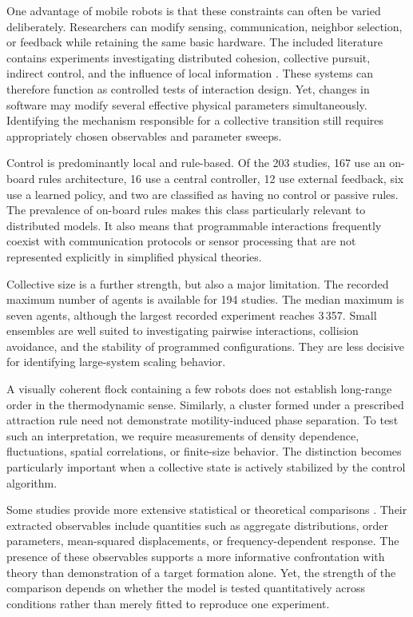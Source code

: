 One advantage of mobile robots is that these
constraints can often be varied deliberately.
Researchers can modify sensing, communication,
neighbor selection, or feedback while retaining
the same basic hardware. The included literature
contains experiments investigating distributed
cohesion, collective pursuit, indirect control,
and the influence of local information
\cite{Lee2022distributedcohesive,Tran2022frontierledswarmin,Yang2023collectivechaseem,Vega2023indirectswarmcontr,Vega2023simulatelessexpec,Vega2024agentbasedemulatio,Gao2023robustdistributedc,Baumann2024hybridflockforma,Zhou2024anticipationpromote,CetinaDenis2025flockingcontrolfor}.
These systems can therefore function as controlled
tests of interaction design. Yet, changes in
software may modify several effective physical
parameters simultaneously. Identifying the
mechanism responsible for a collective transition
still requires appropriately chosen observables
and parameter sweeps.

Control is predominantly local and rule-based.
Of the 203 studies, 167 use an on-board rules
architecture, 16 use a central controller,
12 use external feedback, six use a learned
policy, and two are classified as having no
control or passive rules. The prevalence of
on-board rules makes this class particularly
relevant to distributed models. It also means
that programmable interactions frequently
coexist with communication protocols or sensor
processing that are not represented explicitly
in simplified physical theories.

Collective size is a further strength, but also
a major limitation. The recorded maximum number
of agents is available for 194 studies.
The median maximum is seven agents, although
the largest recorded experiment reaches 3\,357.
Small ensembles are well suited to investigating
pairwise interactions, collision avoidance,
and the stability of programmed configurations.
They are less decisive for identifying
large-system scaling behavior.

A visually coherent flock containing a few
robots does not establish long-range order in
the thermodynamic sense. Similarly, a cluster
formed under a prescribed attraction rule
need not demonstrate motility-induced phase
separation. To test such an interpretation,
we require measurements of density dependence,
fluctuations, spatial correlations, or
finite-size behavior. The distinction becomes
particularly important when a collective state
is actively stabilized by the control algorithm.

Some studies provide more extensive statistical
or theoretical comparisons
\cite{Spears2004distributedphysics,Guzzi2014bioinspiredobstacle,Cazenille2016automatedcalibratio,Xiao2023perceptionofmotion,Barone2024experimentalandnum,Paramanick2025spontaneousemergenc,Zhang2026emergentnonhermiti}.
Their extracted observables include quantities
such as aggregate distributions, order parameters,
mean-squared displacements, or frequency-dependent
response. The presence of these observables
supports a more informative confrontation with
theory than demonstration of a target formation
alone. Yet, the strength of the comparison
depends on whether the model is tested
quantitatively across conditions rather than
merely fitted to reproduce one experiment.

